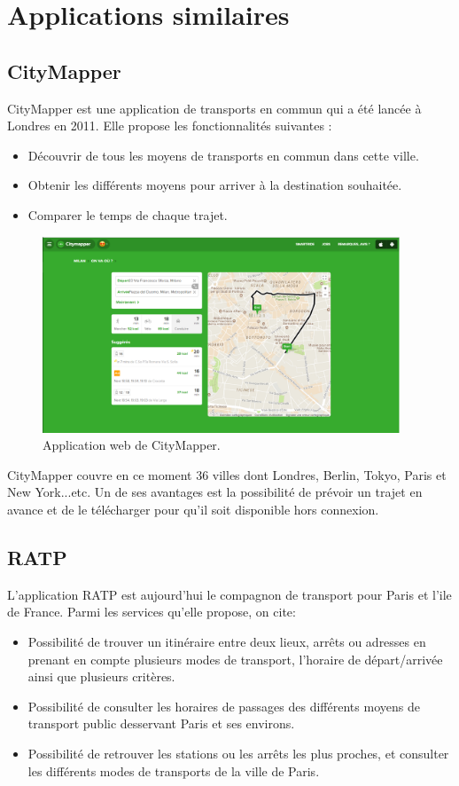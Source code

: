 \section{Applications similaires}			
\subsection{CityMapper}
CityMapper est une application de transports en commun qui a été lancée à Londres en 2011.
Elle propose les fonctionnalités suivantes : 
\begin{itemize}
	\item Découvrir de tous les moyens de transports en commun dans cette ville.
	\item Obtenir les différents moyens pour arriver à la destination souhaitée.
	\item Comparer le temps de chaque trajet.
\end{itemize}

\begin{figure}[h!]
	\center
	\includegraphics[width=0.95\textwidth]{img/citymapper.png}
	\caption{Application web de CityMapper.}
\end{figure}

CityMapper couvre en ce moment 36 villes dont Londres, Berlin, Tokyo, Paris et New York...etc.  Un de ses avantages est la possibilité de prévoir un trajet en avance et de le télécharger pour qu'il soit disponible hors connexion.

\subsection{RATP}
L'application RATP est aujourd'hui le compagnon de transport pour Paris et l'ile de France.
Parmi les services qu'elle propose, on cite:
\begin{itemize}
	\item Possibilité de trouver un itinéraire entre deux lieux, arrêts ou adresses en prenant en compte plusieurs modes de transport, l'horaire de départ/arrivée ainsi que plusieurs critères.
	\item Possibilité de consulter les horaires de passages des différents moyens de transport public desservant Paris et ses environs. 
	\item Possibilité de retrouver les stations ou les arrêts les plus proches, et consulter les différents modes de transports de la ville de Paris.
\end{itemize}

